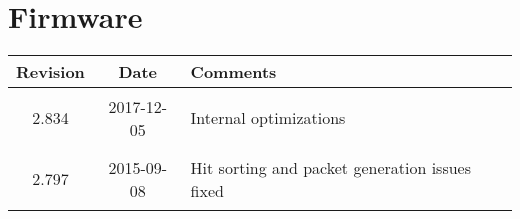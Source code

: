 \section{Firmware}
\begin{tabularx}{\textwidth}{|c|c|X|}
    \hline
    Revision & Date & Comments\\
    \hline\hline
    \hypertarget{fwrev}{2.834} & 2017-12-05 & Internal optimizations\\
    \hline
    \hypertarget{fwrev}{2.797} & 2015-09-08 & Hit sorting and packet generation issues fixed\\
    \hline
\end{tabularx}